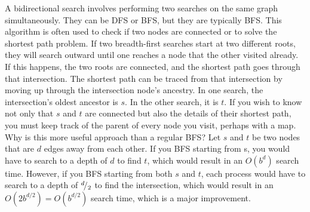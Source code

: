 A bidirectional search involves performing two searches on the same graph simultaneously. They can be DFS or BFS, but they are typically BFS. This algorithm is often used to check if two nodes are connected or to solve the shortest path problem. If two breadth-first searches start at two different roots, they will search outward until one reaches a node that the other visited already. If this happens, the two roots are connected, and the shortest path goes through that intersection. The shortest path can be traced from that intersection by moving up through the intersection node's ancestry. In one search, the intersection's oldest ancestor is $s$. In the other search, it is $t$. If you wish to know not only that $s$ and $t$ are connected but also the details of their shortest path, you must keep track of the parent of every node you visit, perhaps with a map. \\

Why is this more useful approach than a regular BFS? Let $s$ and $t$ be two nodes that are $d$ edges away from each other. If you BFS starting from s, you would have to search to a depth of $d$ to find $t$, which would result in an $O(b^d)$ search time. However, if you BFS starting from both $s$ and $t$, each process would have to search to a depth of ${}^{d}\!/_{2}$ to find the intersection, which would result in an $O(2b^{d/2})=O(b^{d/2})$ search time, which is a major improvement. \\

